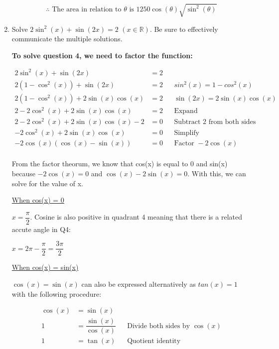 \documentclass[12pt]{book}
\begin{document}
\begin{enumerate}
\vspace{-0.5cm}
$$\boxed{\therefore \text{ The area in relation to } \theta \text{ is } 1250\cos(\theta)\sqrt{\sin^2(\theta)}}$$

\newpage


\item Solve $2\sin^2(x) + \sin(2x) = 2$ $(x \in \mathbb{R})$. Be sure to effectively communicate the multiple solutions.

\textbf{To solve question 4, we need to factor the function:}

\begin{align*}
    2\sin^2(x) + \sin(2x) &= 2 \\
    2(1-\cos^2(x)) + \sin(2x) &= 2 && sin^2(x) = 1 - cos^2(x) \\
    2(1-\cos^2(x)) + 2\sin(x)\cos(x) &= 2 && \sin(2x) = 2\sin(x)\cos(x) \\
    2-2\cos^2(x) + 2\sin(x)\cos(x) &= 2 && \text{Expand}\\
    2 - 2\cos^2(x) + 2\sin(x)\cos(x) - 2 &= 0 && \text{Subtract 2 from both sides}\\
    - 2\cos^2(x) + 2\sin(x)\cos(x) &= 0 && \text{Simplify}\\
    - 2\cos(x)(\cos(x) - \sin(x)) &= 0 && \text{Factor } -2\cos(x)\\
\end{align*}

From the factor theorum, we know that cos(x) is equal to 0 and sin(x) because $- 2\cos(x) = 0$ and $\cos(x) - 2\sin(x) = 0$. With this, we can solve for the value of x.

\vspace{0.3cm}
\underline{When cos(x) = 0}

\vspace{0.1cm}
$x = \boxed{\dfrac{\pi}{2}}$. Cosine is also positive in quadrant 4 meaning that there is a 
related accute angle in Q4:

$x = 2\pi - \dfrac{\pi}{2} = \boxed{\dfrac{3\pi}{2}}$

\vspace{0.3cm}
\underline{When cos(x) = sin(x)}

$\cos(x) = \sin(x)$ can also be expressed alternatively as $tan(x) = 1$ with the following procedure:

\begin{align*}
    \cos(x) &= \sin(x) \\
    1 &= \dfrac{\sin(x)}{\cos(x)} && \text{Divide both sides by } \cos(x) \\
    1 &= \tan(x) && \text{Quotient identity}
\end{align*}


\end{enumerate}
\end{document}
